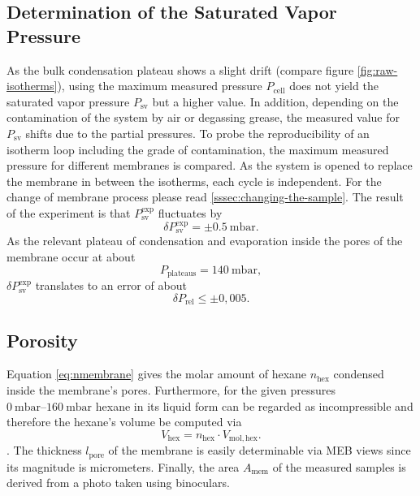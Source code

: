 \documentclass[../thesis.tex]{subfiles}
\begin{document}
        \subsection{Determination of the Saturated Vapor Pressure}

            As the bulk condensation plateau shows a slight drift (compare figure \cref{fig:raw-isotherms}), using the maximum measured pressure $P_\mathrm{cell}$ does not yield the saturated vapor pressure $P_\mathrm{sv}$ but a higher value. In addition, depending on the contamination of the system by air or degassing grease, the measured value for $P_\mathrm{sv}$ shifts due to the partial pressures. To probe the reproducibility of an isotherm loop including the grade of contamination, the maximum measured pressure for different membranes is compared. As the system is opened to replace the membrane in between the isotherms, each cycle is independent. For the change of membrane process please read \cref{sssec:changing-the-sample}. The result of the experiment is that $P_\mathrm{sv}^\mathrm{exp}$ fluctuates by
            \begin{equation}
                \delta P_\mathrm{sv}^\mathrm{exp} = \pm \SI{0,5}{\milli\bar}.
                \label{eq:delta-Psat}
            \end{equation}
            As the relevant plateau of condensation and evaporation inside the pores of the membrane occur at about
            \begin{equation}
                P_\mathrm{plateaus} = \SI{140}{\milli\bar},
            \end{equation}
            $\delta P_\mathrm{sv}^\mathrm{exp}$ translates to an error of about
            \begin{equation}
                \delta P_\mathrm{rel} \le \pm 0,005.
                \label{eq:delta-Prel}
            \end{equation}


        \subsection{Porosity}
        \label{subsec:porosity}

            Equation \cref{eq:nmembrane} gives the molar amount of hexane $n_\mathrm{hex}$ condensed inside the membrane's pores. Furthermore, for the given pressures $\SIrange{0}{160}{\milli\bar}$ hexane in its liquid form can be regarded as incompressible and therefore the hexane's volume be computed via
            \begin{equation*}
                V_\mathrm{hex} = n_\mathrm{hex} \cdot V_\mathrm{mol, hex}.
            \end{equation*}.
            The thickness $l_\mathrm{pore}$ of the membrane is easily determinable via MEB views since its magnitude is micrometers. Finally, the area $A_\mathrm{mem}$ of the measured samples is derived from a photo taken using binoculars.
\end{document}
